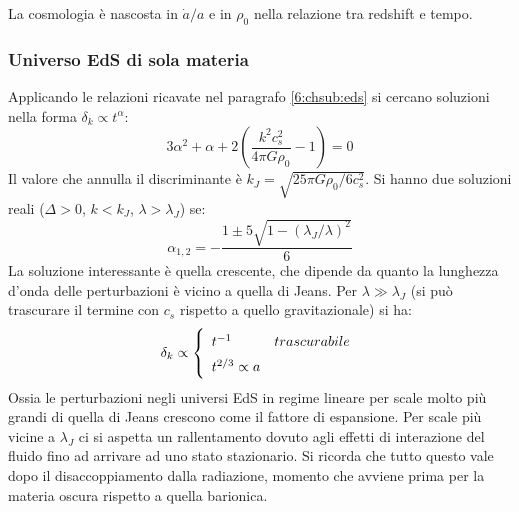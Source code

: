 La cosmologia è nascosta in $\dot{a}/a$ e in $\rho_0$ nella relazione tra redshift e tempo.


\subsubsection{Universo EdS di sola materia}
Applicando le relazioni ricavate nel paragrafo \ref{6:chsub:eds} si cercano soluzioni nella forma $\delta_k \propto t^\alpha$:
\begin{equation*}
3\alpha^2 + \alpha + 2\left( \frac{k^2 c_s^2}{4\pi G \rho_0}-1\right)=0
\end{equation*}
Il valore che annulla il discriminante è $k_J= \sqrt{25\pi G \rho_0 /6c_s^2}$. Si hanno due soluzioni reali ($\Delta >0$, $k<k_J$, $\lambda >\lambda_J$) se:
\begin{equation*}
\alpha_{1,2}=-\frac{1\pm 5\sqrt{1-\left( \lambda_J /\lambda\right)^2}}{6}
\end{equation*}
La soluzione interessante è quella crescente, che dipende da quanto la lunghezza d'onda delle perturbazioni è vicino a quella di Jeans.
Per $\lambda \gg \lambda_J$ (si può trascurare il termine con $c_s$ rispetto a quello gravitazionale) si ha:
\begin{equation}\delta_k \propto  \left\{
    \def\arraystretch{1.5}
        \begin{array}{ll}
            t^{-1} & trascurabile \\
            t^{2/3} \propto a & 
    \end{array}\right. 
\end{equation}
Ossia le perturbazioni negli universi EdS in regime lineare per scale molto più grandi di quella di Jeans crescono come il fattore di espansione. Per scale più vicine a $\lambda_J$ ci si aspetta un rallentamento dovuto agli effetti di interazione del fluido fino ad arrivare ad uno stato stazionario. Si ricorda che tutto questo vale dopo il disaccoppiamento dalla radiazione, momento che avviene prima per la materia oscura rispetto a quella barionica.

